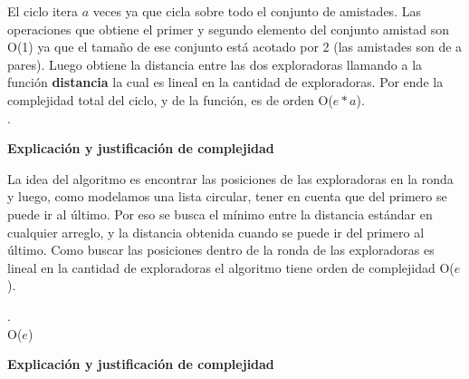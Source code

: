 \documentclass[11pt]{article}
\begin{document}
El ciclo itera $a$ veces ya que cicla sobre todo el conjunto de amistades. Las operaciones que obtiene el 
primer y segundo elemento del conjunto amistad son O(1) ya que el tamaño de ese conjunto está acotado por 
2 (las amistades son de a pares). Luego obtiene la distancia entre las dos exploradoras llamando a la 
función \textbf{distancia} la cual es lineal en la cantidad de exploradoras. Por ende la complejidad
total del ciclo, y de la función, es de orden O($e*a$). \\
\noindent\makebox[\linewidth]{\rule{17cm}{0.4pt}}
.
\\

\begin{center}
\textbf{Explicación y justificación de complejidad} \\ 
\end{center} 

La idea del algoritmo es encontrar las posiciones de las exploradoras en la ronda y luego, como modelamos 
una lista circular, tener en cuenta que del primero se puede ir al último. Por eso se busca el mínimo entre
la distancia estándar en cualquier arreglo, y la distancia obtenida cuando se puede ir del primero al último.
Como buscar las posiciones dentro de la ronda de las exploradoras es lineal en la cantidad de exploradoras 
el algoritmo tiene orden de complejidad O($e$).

\noindent\makebox[\linewidth]{\rule{17cm}{0.4pt}}
.\\
 {O($e$)}

\vspace{3mm}
\begin{center}
\textbf{Explicación y justificación de complejidad} \\ 
\end{center} 
\end{document}
